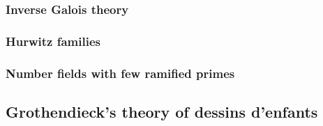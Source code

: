 \documentclass{dcthesis}
\numberwithin{equation}{section}
\theoremstyle{definition}
\theoremstyle{remark}
\begin{document}
{{{      \subsubsection{Inverse Galois theory}{
      }
      \subsubsection{Hurwitz families}{
      }
      \subsubsection{Number fields with few ramified primes}{
      }
    }
    \subsection[Dessins d'enfants]{Grothendieck's theory of dessins d'enfants}{
    }
  }
}
\end{document}
